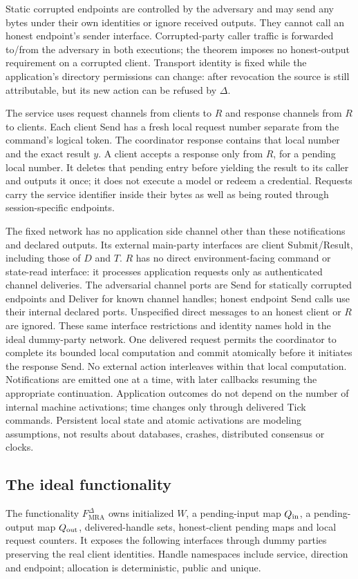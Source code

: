 Static corrupted endpoints are controlled by the adversary and may send
any bytes under their own identities or ignore received outputs.
They cannot call an honest endpoint's sender interface. Corrupted-party
caller traffic is forwarded to/from the adversary in both executions;
the theorem imposes no honest-output requirement on a corrupted client.
Transport identity is fixed while the application's directory permissions
can change: after revocation the source is still attributable, but its
new action can be refused by $\Delta$.

The service uses request channels from clients to $R$ and response channels
from $R$ to clients. Each client Send has a fresh local request number
separate from the command's logical token. The coordinator response
contains that local number and the exact result $y$.
A client accepts a response only from $R$, for a pending local number.
It deletes that pending entry before yielding the result to its caller
and outputs it once; it does not execute a model or redeem a credential.
Requests carry the service identifier inside their bytes as well as
being routed through session-specific endpoints.

The fixed network has no application side channel other than these
notifications and declared outputs. Its external main-party interfaces
are client Submit/Result, including those of $D$ and $T$.
$R$ has no direct environment-facing command or state-read interface:
it processes application requests only as authenticated channel deliveries.
The adversarial channel ports are Send for statically corrupted endpoints
and Deliver for known channel handles; honest endpoint Send calls use
their internal declared ports. Unspecified direct messages to an honest
client or $R$ are ignored. These same interface restrictions and identity
names hold in the ideal dummy-party network.
One delivered request permits the
coordinator to complete its bounded local computation and commit
atomically before it initiates the response Send. No external action
interleaves within that local computation. Notifications are emitted
one at a time, with later callbacks resuming the appropriate continuation.
Application outcomes do not depend on the number of internal machine
activations; time changes only through delivered Tick commands.
Persistent local state and atomic activations are modeling assumptions,
not results about databases, crashes, distributed consensus or clocks.

\subsection{The ideal functionality}
\label{app:uc-functionality}
The functionality $F_{\mathrm{MRA}}^\Delta$ owns initialized $W$,
a pending-input map $Q_{\rm in}$, a pending-output map $Q_{\rm out}$,
delivered-handle sets, honest-client pending maps and local request counters.
It exposes the following interfaces through dummy parties preserving the
real client identities. Handle namespaces include service, direction
and endpoint; allocation is deterministic, public and unique.

